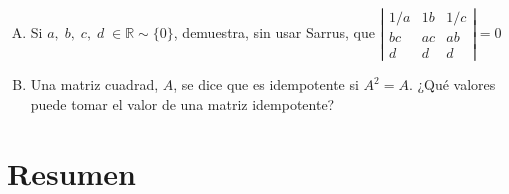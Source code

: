 \begin{enumerate}[Q. 1. ]
\item Si $a,\; b,\; c,\; d\; \in \mathbb R \sim \{0\}$, demuestra, sin usar Sarrus, que $\left| \begin{matrix} 1/a&1b&1/c\\ bc&ac&ab\\d&d&d \end{matrix} \right|=0$


\item Una matriz cuadrad, $A$, se dice que es idempotente si $A^2=A$. ¿Qué valores puede tomar el valor de una matriz idempotente?


\end{enumerate}

\clearpage

\section{Resumen}

